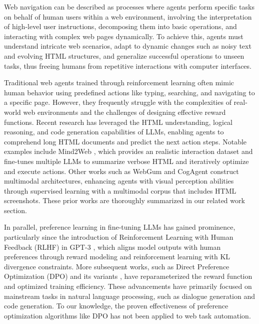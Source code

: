 \documentclass{article}
\begin{document}
  Web navigation can be described as processes where agents perform specific tasks on behalf of human users within a web environment, involving the interpretation of high-level user instructions, decomposing them into basic operations, and interacting with complex web pages dynamically. To achieve this, agents must understand intricate web scenarios, adapt to dynamic changes such as noisy text and evolving HTML structures, and generalize successful operations to unseen tasks, thus freeing humans from repetitive interactions with computer interfaces.
  
  Traditional web agents trained through reinforcement learning \citep{shi2017world,yao2022webshop} often mimic human behavior using predefined actions like typing, searching, and navigating to a specific page. However, they frequently struggle with the complexities of real-world web environments and the challenges of designing effective reward functions. Recent research has leveraged the HTML understanding, logical reasoning, and code generation capabilities of LLMs, enabling agents to comprehend long HTML documents and predict the next action steps. Notable examples include Mind2Web \citep{deng2024mind2web}, which provides an realistic interaction dataset and fine-tunes multiple LLMs to summarize verbose HTML and iteratively optimize and execute actions. Other works such as WebGum \citep{furuta2023multimodal} and CogAgent \citep{hong2023cogagent} construct multimodal architectures, enhancing agents with visual perception abilities through supervised learning with a multimodal corpus that includes HTML screenshots. These prior works are thoroughly summarized in our related work section.
  
  In parallel, preference learning in fine-tuning LLMs has gained prominence, particularly since the introduction of Reinforcement Learning with Human Feedback (RLHF) in GPT-3 \citep{ziegler2019fine,ouyang2022training}, which aligns model outputs with human preferences through reward modeling and reinforcement learning with KL divergence constraints. More subsequent works, such as Direct Preference Optimization (DPO) \citep{amini2024direct} and its variants \citep{hong2024orpo,morimura2024filtered}, have reparameterized the reward function and optimized training efficiency. These advancements have primarily focused on mainstream tasks in natural language processing, such as dialogue generation and code generation. To our knowledge, the proven effectiveness of preference optimization algorithms like DPO has not been applied to web task automation.
  
\end{document}
